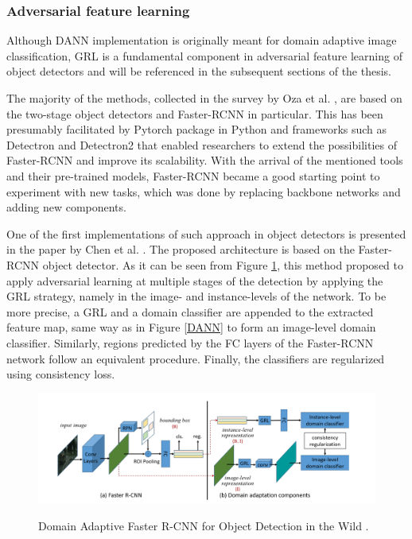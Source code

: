 \documentclass[english, 12pt, a4paper, elec, utf8, a-1b, online]{aaltothesis}
\begin{document}
\subsubsection{Adversarial feature learning}
\label{adv_approach} 

Although DANN implementation is originally meant for domain adaptive image classification, GRL is a fundamental component in adversarial feature learning of object detectors and will be referenced in the subsequent sections of the thesis. 

The majority of the methods, collected in the survey by Oza et al. \cite{Oza2021}, are based on the two-stage object detectors and Faster-RCNN \cite{ima} in particular. This has been presumably facilitated by Pytorch \cite{NEURIPS2019_9015} package in Python and frameworks such as Detectron \cite{Detectron2018} and Detectron2 \cite{wu2019Detectron2} that enabled researchers to extend the possibilities of Faster-RCNN and improve its scalability. With the arrival of the mentioned tools and their pre-trained models, Faster-RCNN became a good starting point to experiment with new tasks, which was done by replacing backbone networks and adding new components. 

One of the first implementations of such approach in object detectors is presented in the paper by Chen et al. \cite{Chen2018}. The proposed architecture is based on the Faster-RCNN object detector. As it can be seen from Figure \ref{Faster_rcnn_DA}, this method proposed to apply adversarial learning at multiple stages of the detection by applying the GRL strategy, namely in the image- and instance-levels of the network. To be more precise, a GRL and a domain classifier are appended to the extracted feature map, same way as in Figure \ref{DANN} to form an image-level domain classifier. Similarly, regions predicted by the FC layers of the Faster-RCNN network follow an equivalent procedure. Finally, the classifiers are regularized using consistency loss.   

\begin{figure}[htb]
	\begin{center}
		\includegraphics[width=16cm]{./faster_rcnn_DA.png}
	\end{center}
	\caption{Domain Adaptive Faster R-CNN for Object Detection in the Wild \cite{Chen2018}.}
	\begin{center}
		\label{Faster_rcnn_DA}
	\end{center}
\end{figure}
\FloatBarrier
\end{document}

